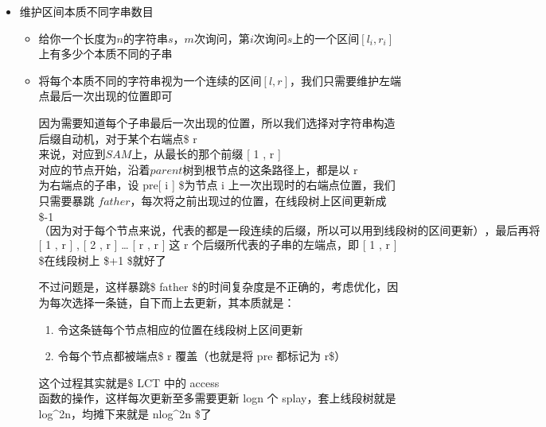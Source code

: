\documentclass[]{article}
\begin{document}
\begin{itemize}
\item
  维护区间本质不同字串数目

  \begin{itemize}
  \item
    给你一个长度为\(n\)的字符串\(s\)，\(m\)次询问，第\(i\)次询问\(s\)上的一个区间\([l_i,r_i]\)上有多少个本质不同的子串
  \item
    将每个本质不同的字符串视为一个连续的区间\([l,r]\)，我们只需要维护左端点最后一次出现的位置即可

    因为需要知道每个子串最后一次出现的位置，所以我们选择对字符串构造后缀自动机，对于某个右端点\$
    r \(来说，对应到 SAM 上，从最长的那个前缀\) {[} 1 , r {]}
    \(对应的节点开始，沿着 parent 树到根节点的这条路径上，都是以\) r
    \(为右端点的子串，设\) pre{[} i {]} \$为节点 i
    上一次出现时的右端点位置，我们只需要暴跳
    \(father\)，每次将之前出现过的位置，在线段树上区间更新成 \$-1
    \(（因为对于每个节点来说，代表的都是一段连续的后缀，所以可以用到线段树的区间更新），最后再将\)
    {[} 1 , r {]} , {[} 2 , r {]} \ldots{} {[} r , r {]} \(这\) r
    \(个后缀所代表的子串的左端点，即\) {[} 1 , r {]} \$在线段树上 \$+1
    \$就好了

    不过问题是，这样暴跳\$ father
    \$的时间复杂度是不正确的，考虑优化，因为每次选择一条链，自下而上去更新，其本质就是：

    \begin{enumerate}
    \def\labelenumi{\arabic{enumi}.}
    \item
      令这条链每个节点相应的位置在线段树上区间更新
    \item
      令每个节点都被端点\$ r \(覆盖（也就是将\) pre \(都标记为\) r\$）
    \end{enumerate}

    这个过程其实就是\$ LCT \(中的\) access
    \(函数的操作，这样每次更新至多需要更新\) logn \(个\)
    splay\(，套上线段树就是\) log\^{}2n\(，均摊下来就是\) nlog\^{}2n
    \$了
  \end{itemize}
\end{itemize}
\end{document}
